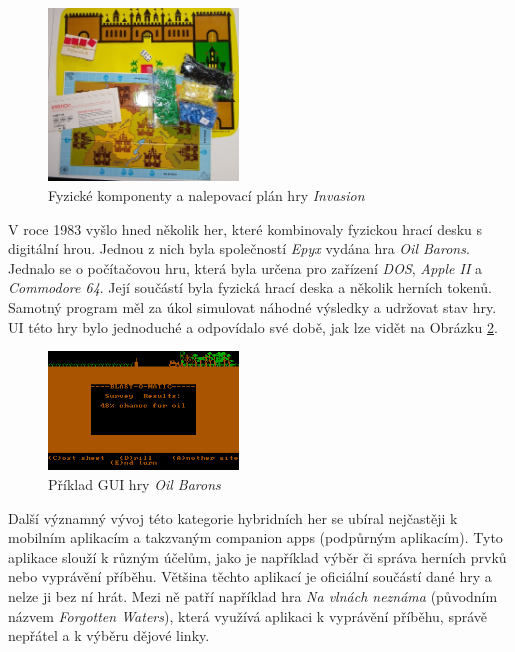 \begin{figure}[H]
    \centering
    \includegraphics[width=0.45\textwidth]{resources/figures/invasion.jpg}
    \caption{Fyzické komponenty a nalepovací plán hry \textit{Invasion} \cite{invasion}}
    \label{fig:invasion}
\end{figure}

V roce 1983 vyšlo hned několik her, které kombinovaly fyzickou hrací desku s digitální hrou. Jednou z nich byla společností \textit{Epyx} vydána hra \textit{Oil Barons}. Jednalo se o počítačovou hru, která byla určena pro zařízení \textit{DOS}, \textit{Apple II} a \textit{Commodore 64}. Její součástí byla fyzická hrací deska a několik herních tokenů. Samotný program měl za úkol simulovat náhodné výsledky a udržovat stav hry. UI této hry bylo jednoduché a odpovídalo své době, jak lze vidět na Obrázku \ref{fig:oil_barons}. \cite{oil_barons}

\begin{figure}[H]
    \centering
    \includegraphics[width=0.45\textwidth]{resources/figures/oil_barons.png}
    \caption{Příklad GUI hry \textit{Oil Barons} \cite{oil_barons}}
    \label{fig:oil_barons}
\end{figure}

Další významný vývoj této kategorie hybridních her se ubíral nejčastěji k mobilním aplikacím a takzvaným companion apps (podpůrným aplikacím). Tyto aplikace slouží k různým účelům, jako je například výběr či správa herních prvků nebo vyprávění příběhu. Většina těchto aplikací je oficiální součástí dané hry a nelze ji bez ní hrát. Mezi ně patří například hra \textit{Na vlnách neznáma} (původním názvem \textit{Forgotten Waters}), která využívá aplikaci k vyprávění příběhu, správě nepřátel a k výběru dějové linky.

